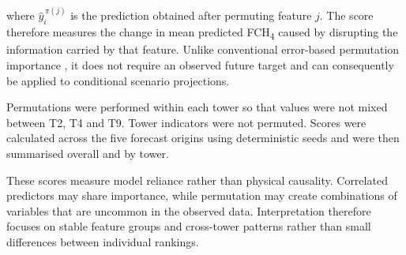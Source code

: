 where \(\hat{y}^{\,\pi(j)}_i\) is the prediction obtained after permuting
feature \(j\). The score therefore measures the change in mean predicted
FCH\textsubscript{4} caused by disrupting the information carried by that
feature. Unlike conventional error-based permutation importance
\cite{breiman2001randomforests}, it does not require an observed future target
and can consequently be applied to conditional scenario projections.

Permutations were performed within each tower so that values were not mixed
between T2, T4 and T9. Tower indicators were not permuted. Scores were
calculated across the five forecast origins using deterministic seeds and were
then summarised overall and by tower.

These scores measure model reliance rather than physical causality. Correlated
predictors may share importance, while permutation may create combinations of
variables that are uncommon in the observed data. Interpretation therefore
focuses on stable feature groups and cross-tower patterns rather than small
differences between individual rankings.
